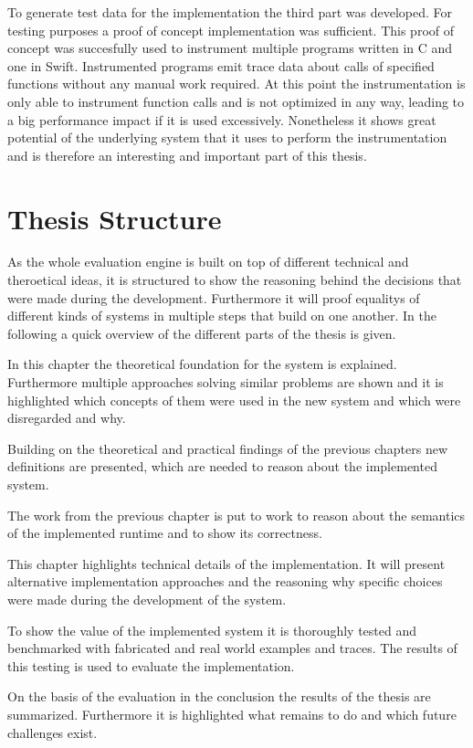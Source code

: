To generate test data for the implementation the third part was developed.
For testing purposes a proof of concept implementation was sufficient.
This proof of concept was succesfully used to instrument multiple programs written in C and one in Swift.
Instrumented programs emit trace data about calls of specified functions without any manual work required.
At this point the instrumentation is only able to instrument function calls and is not optimized in any way, leading to a big performance impact if it is used excessively.
Nonetheless it shows great potential of the underlying system that it uses to perform the instrumentation and is therefore an interesting and important part of this thesis.

\section{Thesis Structure}
\label{sec:intro:structure}

As the whole evaluation engine is built on top of different technical and theroetical ideas, it is structured to show
the reasoning behind the decisions that were made during the development.
Furthermore it will proof equalitys of different kinds of systems in multiple steps that build on one another.
In the following a quick overview of the different parts of the thesis is given.

\textbf{}

In this chapter the theoretical foundation for the system is explained.
Furthermore multiple approaches solving similar problems are shown and it is highlighted which concepts of them were
used in the new system and which were disregarded and why.


\textbf{}

Building on the theoretical and practical findings of the previous chapters new definitions are presented, which are needed to reason about the implemented system.

\textbf{}

The work from the previous chapter is put to work to reason about the semantics of the implemented runtime and to show its correctness.

\textbf{}

This chapter highlights technical details of the implementation.
It will present alternative implementation approaches and the reasoning why specific choices were made during the development of the system.

\textbf{}

To show the value of the implemented system it is thoroughly tested and benchmarked with fabricated and real world examples and traces.
The results of this testing is used to evaluate the implementation.

\textbf{}

On the basis of the evaluation in the conclusion the results of the thesis are summarized.
Furthermore it is highlighted what remains to do and which future challenges exist.


